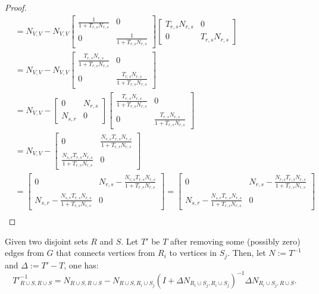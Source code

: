 \begin{proof}
\begin{align}
        &= N_{V, V} - N_{V, V} \begin{bmatrix} \frac{1}{1 + T_{r, s} N_{r, s}} & 0 \\ 0 & \frac{1}{1 + T_{r, s} N_{r, s}} \end{bmatrix} \begin{bmatrix} T_{r, s} N_{r, s} & 0 \\ 0 & T_{r, s} N_{r, s} \end{bmatrix} \\
        &= N_{V, V} - N_{V, V} \begin{bmatrix} \frac{T_{r, s} N_{r, s}}{1 + T_{r, s} N_{r, s}} & 0 \\ 0 & \frac{T_{r, s} N_{r, s}}{1 + T_{r, s} N_{r, s}} \end{bmatrix} \\
        &= N_{V, V} - \begin{bmatrix} 0 & N_{r, s} \\ N_{s, r} & 0 \end{bmatrix} \begin{bmatrix} \frac{T_{r, s} N_{r, s}}{1 + T_{r, s} N_{r, s}} & 0 \\ 0 & \frac{T_{r, s} N_{r, s}}{1 + T_{r, s} N_{r, s}} \end{bmatrix} \\
        &= N_{V, V} - \begin{bmatrix} 0 & \frac{N_{r, s} T_{r, s} N_{r, s}}{1 + T_{r, s} N_{r, s}} \\ \frac{N_{s, r} T_{r, s} N_{r, s}}{1 + T_{r, s} N_{r, s}} & 0 \end{bmatrix} \\
        &= \begin{bmatrix} 0 & N_{r, s} - \frac{N_{r, s} T_{r, s} N_{r, s}}{1 + T_{r, s} N_{r, s}} \\ N_{s, r} - \frac{N_{s, r} T_{r, s} N_{r, s}}{1 + T_{r, s} N_{r, s}} & 0 \end{bmatrix} 
        = \begin{bmatrix} 0 & N_{r, s} - \frac{N_{r, s} T_{r, s} N_{r, s}}{1 + T_{r, s} N_{r, s}} \\ N_{s, r} - \frac{N_{s, r} T_{r, s} N_{r, s}}{1 + T_{r, s} N_{r, s}} & 0 \end{bmatrix} \\
    \end{align}
\end{proof}

\begin{theorem}[Update 2]
    Given two disjoint sets \(R\) and \(S\). Let \(T'\) be \(T\) after removing some (possibly zero) edges from \(G\) that connects vertices from \(R_i\) to vertices in \(S_j\).
    Then, let \(N := T^{-1}\) and \(\Delta := T' - T\), one has:
    \[
        {T'}^{-1}_{R \cup S, R \cup S} = N_{R \cup S, R \cup S} - N_{R \cup S, R_i \cup S_j}(I + \Delta N_{R_i \cup S_j, R_i \cup S_j})^{-1} \Delta N_{R_i \cup S_j, R \cup S}.
    \]
\end{theorem}

